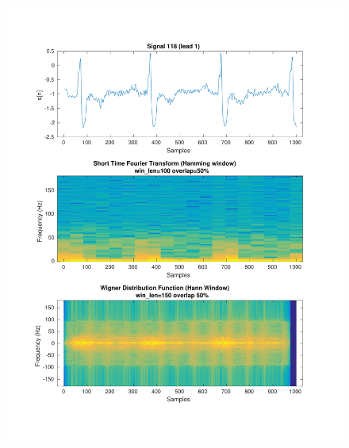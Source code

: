 \documentclass[11pt,a4paper]{article}
\begin{document}
\begin{figure}[H]
\centering
\begin{minipage}{0.48\textwidth}
	\centering
	\includegraphics[width=\textwidth]{fig/118l1_stft_wdf.pdf}
	

\end{minipage}
\end{figure}
\end{document}
